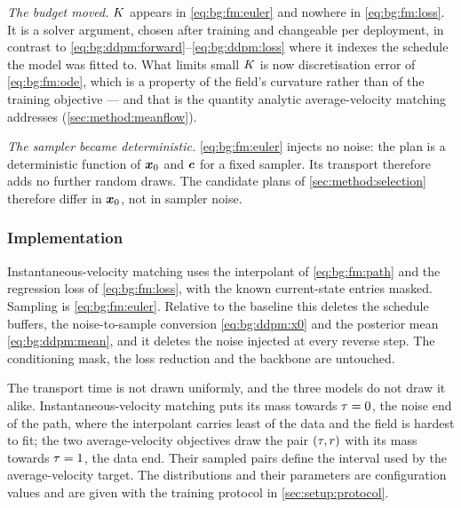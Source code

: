 \emph{The budget moved.} $K$ appears in \eqref{eq:bg:fm:euler} and nowhere in
\eqref{eq:bg:fm:loss}. It is a solver argument, chosen after training and changeable per
deployment, in contrast to \eqref{eq:bg:ddpm:forward}--\eqref{eq:bg:ddpm:loss} where it
indexes the schedule the model was fitted to. What limits small $K$ is now discretisation
error of \eqref{eq:bg:fm:ode}, which is a property of the field's curvature rather than of the
training objective --- and that is the quantity analytic average-velocity matching addresses
(\autoref{sec:method:meanflow}).

\emph{The sampler became deterministic.} \eqref{eq:bg:fm:euler} injects no noise: the plan is
a deterministic function of $\boldsymbol{x}_{0}$ and $\boldsymbol{c}$ for a fixed sampler. Its transport
therefore adds no further random draws. The candidate plans of
\autoref{sec:method:selection} therefore differ in $\boldsymbol{x}_{0}$, not in sampler noise.

\subsubsection*{Implementation}

Instantaneous-velocity matching uses the interpolant of \eqref{eq:bg:fm:path} and the regression
loss of \eqref{eq:bg:fm:loss}, with the known current-state entries masked.
Sampling is \eqref{eq:bg:fm:euler}. Relative to the baseline this deletes the schedule buffers,
the noise-to-sample conversion \eqref{eq:bg:ddpm:x0} and the posterior mean
\eqref{eq:bg:ddpm:mean}, and it deletes the noise injected at every reverse step. The
conditioning mask, the loss reduction and the backbone are untouched.

The transport time is not drawn uniformly, and the three models do not draw it alike.
Instantaneous-velocity matching puts its mass towards $\tau = 0$, the noise end of the path,
where the interpolant carries least of the data and the field is hardest to fit; the two
average-velocity objectives draw the pair $(\tau,r)$ with its mass towards $\tau = 1$, the data
end. Their sampled pairs define the interval used by the average-velocity target. The distributions and their parameters
are configuration values and are given with the training protocol in
\autoref{sec:setup:protocol}.

